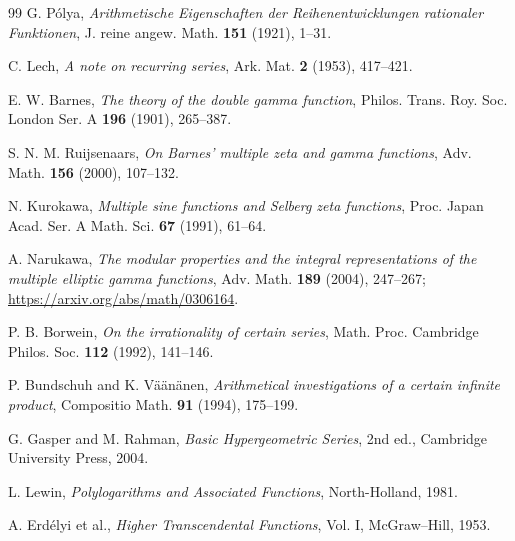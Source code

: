 \documentclass[11pt]{article}
\numberwithin{equation}{section}
\theoremstyle{definition}
\theoremstyle{remark}
\begin{document}
\begin{thebibliography}{99}
G. P\'olya,
\emph{Arithmetische Eigenschaften der Reihenentwicklungen rationaler Funktionen},
J. reine angew. Math. \textbf{151} (1921), 1--31.

C. Lech,
\emph{A note on recurring series},
Ark. Mat. \textbf{2} (1953), 417--421.

E. W. Barnes,
\emph{The theory of the double gamma function},
Philos. Trans. Roy. Soc. London Ser. A \textbf{196} (1901), 265--387.

S. N. M. Ruijsenaars,
\emph{On Barnes' multiple zeta and gamma functions},
Adv. Math. \textbf{156} (2000), 107--132.

N. Kurokawa,
\emph{Multiple sine functions and Selberg zeta functions},
Proc. Japan Acad. Ser. A Math. Sci. \textbf{67} (1991), 61--64.

A. Narukawa,
\emph{The modular properties and the integral representations of the multiple elliptic gamma functions},
Adv. Math. \textbf{189} (2004), 247--267;
\url{https://arxiv.org/abs/math/0306164}.

P. B. Borwein,
\emph{On the irrationality of certain series},
Math. Proc. Cambridge Philos. Soc. \textbf{112} (1992), 141--146.

P. Bundschuh and K. V\"a\"an\"anen,
\emph{Arithmetical investigations of a certain infinite product},
Compositio Math. \textbf{91} (1994), 175--199.

G. Gasper and M. Rahman,
\emph{Basic Hypergeometric Series}, 2nd ed.,
Cambridge University Press, 2004.

L. Lewin,
\emph{Polylogarithms and Associated Functions},
North-Holland, 1981.

A. Erd\'elyi et al.,
\emph{Higher Transcendental Functions}, Vol. I,
McGraw--Hill, 1953.
\end{thebibliography}
\end{document}
